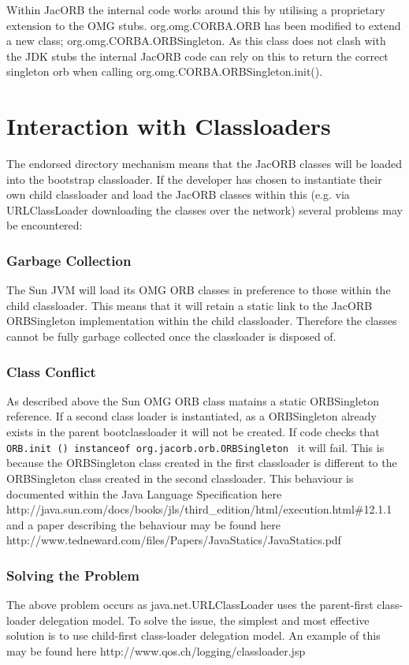 Within JacORB the internal code works around this by utilising a proprietary
extension to the OMG stubs.  org.omg.CORBA.ORB has been modified to extend a new
class; org.omg.CORBA.ORBSingleton. As this class does not clash with the JDK
stubs the internal JacORB code can rely on this to return the correct singleton
orb when calling org.omg.CORBA.ORBSingleton.init().

\section{Interaction with Classloaders}
The endorsed directory mechanism means that the JacORB classes will be loaded
into the bootstrap classloader. If the developer has chosen to instantiate their
own child classloader and load the JacORB classes within this (e.g. via URLClassLoader
downloading the classes over the network) several problems may be encountered:

\subsubsection{Garbage Collection}
The Sun JVM will load its OMG ORB classes in preference to those within the child
classloader. This means that it will retain a static link to the JacORB ORBSingleton
implementation within the child classloader. Therefore the classes cannot be fully garbage
collected once the classloader is disposed of.

\subsubsection{Class Conflict}
As described above the Sun OMG ORB class matains a static ORBSingleton reference. If a second
class loader is instantiated, as a ORBSingleton already exists in the parent bootclassloader
it will not be created. If code checks that
{\tt ORB.init () instanceof org.jacorb.orb.ORBSingleton }
it will fail. This is because the ORBSingleton class created in the first classloader is different
to the ORBSingleton class created in the second classloader. This behaviour is documented within the
Java Language Specification here http://java.sun.com/docs/books/jls/third\_edition/html/execution.html\#12.1.1
and a paper describing the behaviour may be found here http://www.tedneward.com/files/Papers/JavaStatics/JavaStatics.pdf


\subsubsection{Solving the Problem}
The above problem occurs as java.net.URLClassLoader uses the parent-first class-loader delegation model.
To solve the issue, the simplest and most effective solution is to use child-first class-loader delegation
model. An example of this may be found here http://www.qos.ch/logging/classloader.jsp

